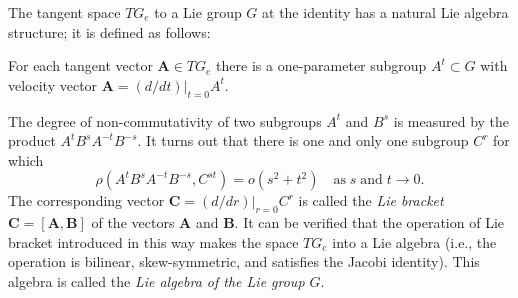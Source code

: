 \documentclass[leqno]{book}
\numberwithin{equation}{section}
\theoremstyle{plain}
\theoremstyle{definition}
\theoremstyle{remark}
\theoremstyle{smallcap}
\numberwithin{prob}{section}
\begin{document}
The tangent space $TG_e$ to a Lie group $G$
at the identity has a natural Lie algebra structure;
it is defined as follows:

For each tangent vector $\mathbf A \in TG_e$
there is a one-parameter subgroup $A^t \subset G$
with velocity vector $\mathbf A = (d/dt)|_{t = 0} A^t$.

The degree of non-commutativity of two subgroups $A^t$ and $B^s$
is measured by the product $A^tB^sA^{-t}B^{-s}$.
%
It turns out that there is one and only one subgroup $C^r$ for which
$$
\rho(A^tB^sA^{-t}B^{-s}, C^{st}) = o(s^2 + t^2)
\quad
\mathrm{as \;}
s \mathrm{\; and \;} t \rightarrow 0.
$$
The corresponding vector $\mathbf C =(d/dr)|_{r = 0} C^r$
is called the \emph{Lie bracket}
%
$\mathbf C = [\mathbf A, \mathbf B]$
of the vectors $\mathbf A$ and $\mathbf B$.
%
It can be verified that the operation of Lie bracket
introduced in this way makes the space $TG_e$
into a Lie algebra (i.e., the operation
is bilinear, skew-symmetric, and satisfies the
Jacobi identity).
%
This algebra is called the \emph{Lie algebra of the Lie group $G$}.
\end{document}
